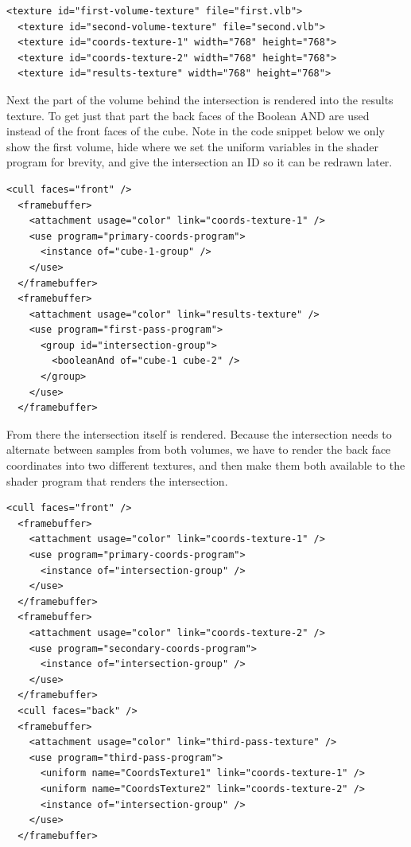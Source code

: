 \documentclass{article}
\begin{document}
\begin{Verbatim}[fontsize=\small]
  <texture id="first-volume-texture" file="first.vlb">
  <texture id="second-volume-texture" file="second.vlb">
  <texture id="coords-texture-1" width="768" height="768">
  <texture id="coords-texture-2" width="768" height="768">
  <texture id="results-texture" width="768" height="768">
\end{Verbatim}

Next the part of the volume behind the intersection is rendered into the results
texture.  To get just that part the back faces of the Boolean AND are used
instead of the front faces of the cube.  Note in the code snippet below we only
show the first volume, hide where we set the uniform variables in the shader
program for brevity, and give the intersection an ID so it can be redrawn later.

\begin{Verbatim}[fontsize=\small]
  <cull faces="front" />
  <framebuffer>
    <attachment usage="color" link="coords-texture-1" />
    <use program="primary-coords-program">
      <instance of="cube-1-group" />
    </use>
  </framebuffer>
  <framebuffer>
    <attachment usage="color" link="results-texture" />
    <use program="first-pass-program">
      <group id="intersection-group">
        <booleanAnd of="cube-1 cube-2" />
      </group>
    </use>
  </framebuffer>
\end{Verbatim}

From there the intersection itself is rendered.  Because the intersection needs
to alternate between samples from both volumes, we have to render the back face
coordinates into two different textures, and then make them both available to
the shader program that renders the intersection.

\begin{Verbatim}[fontsize=\small]
  <cull faces="front" />
  <framebuffer>
    <attachment usage="color" link="coords-texture-1" />
    <use program="primary-coords-program">
      <instance of="intersection-group" />
    </use>
  </framebuffer>
  <framebuffer>
    <attachment usage="color" link="coords-texture-2" />
    <use program="secondary-coords-program">
      <instance of="intersection-group" />
    </use>
  </framebuffer>
  <cull faces="back" />
  <framebuffer>
    <attachment usage="color" link="third-pass-texture" />
    <use program="third-pass-program">
      <uniform name="CoordsTexture1" link="coords-texture-1" />
      <uniform name="CoordsTexture2" link="coords-texture-2" />
      <instance of="intersection-group" />
    </use>
  </framebuffer>
\end{Verbatim}
\end{document}
